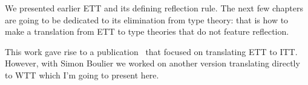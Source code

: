 We presented earlier ETT and its defining reflection rule.
%
%
The next few chapters are going to be dedicated to its elimination from type
theory: that is how to make a translation from ETT to type theories that do
not feature reflection.

This work gave rise to a publication~ that
focused on translating ETT to ITT. However, with Simon Boulier we worked on
another version translating directly to WTT which I'm going to present here.